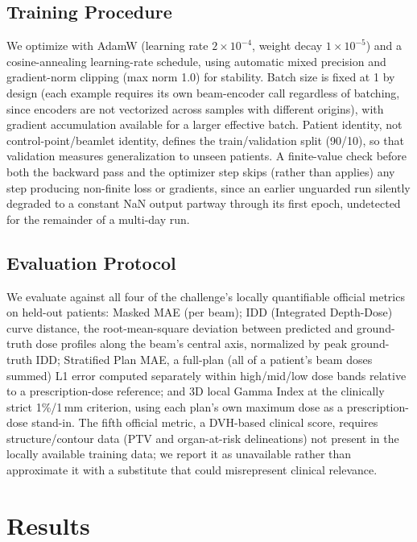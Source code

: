 \documentclass[10pt,conference]{IEEEtran}
\begin{document}
\subsection{Training Procedure}

We optimize with AdamW (learning rate $2\times10^{-4}$, weight decay
$1\times10^{-5}$) and a cosine-annealing learning-rate schedule, using
automatic mixed precision and gradient-norm clipping (max norm 1.0) for
stability. Batch size is fixed at 1 by design (each example requires its
own beam-encoder call regardless of batching, since encoders are not
vectorized across samples with different origins), with gradient
accumulation available for a larger effective batch. Patient identity,
not control-point/beamlet identity, defines the train/validation split
(90/10), so that validation measures generalization to unseen patients.
A finite-value check before both the backward pass and the optimizer
step skips (rather than applies) any step producing non-finite loss or
gradients, since an earlier unguarded run silently degraded to a
constant NaN output partway through its first epoch, undetected for the
remainder of a multi-day run.

\subsection{Evaluation Protocol}

We evaluate against all four of the challenge's locally quantifiable
official metrics on held-out patients: Masked MAE (per beam); IDD
(Integrated Depth-Dose) curve distance, the root-mean-square deviation
between predicted and ground-truth dose profiles along the beam's
central axis, normalized by peak ground-truth IDD; Stratified Plan MAE,
a full-plan (all of a patient's beam doses summed) L1 error computed
separately within high/mid/low dose bands relative to a
prescription-dose reference; and 3D local Gamma Index at the clinically
strict 1\%/1\,mm criterion, using each plan's own maximum dose as a
prescription-dose stand-in. The fifth official metric, a DVH-based
clinical score, requires structure/contour data (PTV and organ-at-risk
delineations) not present in the locally available training data; we
report it as unavailable rather than approximate it with a substitute
that could misrepresent clinical relevance.

\section{Results}
\label{sec:results}
\end{document}
